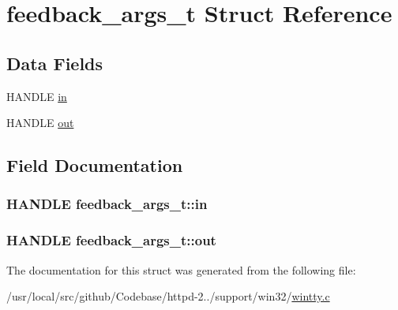 \hypertarget{structfeedback__args__t}{}\section{feedback\+\_\+args\+\_\+t Struct Reference}
\label{structfeedback__args__t}
\subsection*{Data Fields}
\begin{DoxyCompactItemize}
\item 
H\+A\+N\+D\+LE \hyperlink{structfeedback__args__t_a5f9548d0f1f6feec0db1b75db26f75df}{in}
\item 
H\+A\+N\+D\+LE \hyperlink{structfeedback__args__t_a29c6e9f0c5de7561f99f7303e3ddb4ca}{out}
\end{DoxyCompactItemize}


\subsection{Field Documentation}
\subsubsection[{\texorpdfstring{in}{in}}]{\setlength{\rightskip}{0pt plus 5cm}H\+A\+N\+D\+LE feedback\+\_\+args\+\_\+t\+::in}\hypertarget{structfeedback__args__t_a5f9548d0f1f6feec0db1b75db26f75df}{}\label{structfeedback__args__t_a5f9548d0f1f6feec0db1b75db26f75df}
\subsubsection[{\texorpdfstring{out}{out}}]{\setlength{\rightskip}{0pt plus 5cm}H\+A\+N\+D\+LE feedback\+\_\+args\+\_\+t\+::out}\hypertarget{structfeedback__args__t_a29c6e9f0c5de7561f99f7303e3ddb4ca}{}\label{structfeedback__args__t_a29c6e9f0c5de7561f99f7303e3ddb4ca}


The documentation for this struct was generated from the following file\+:\begin{DoxyCompactItemize}
\item 
/usr/local/src/github/\+Codebase/httpd-\/2../support/win32/\hyperlink{wintty_8c}{wintty.\+c}\end{DoxyCompactItemize}
